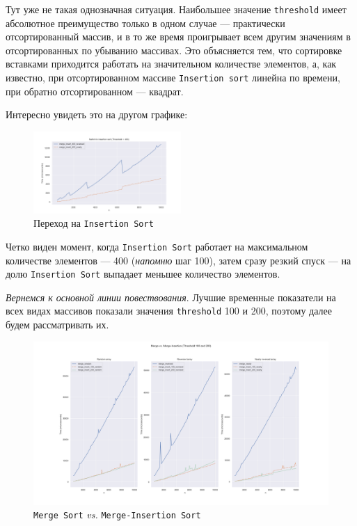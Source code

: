 \documentclass[11pt,a4paper]{scrarticle}
\theoremstyle{definition}
\begin{document}
Тут уже не такая однозначная ситуация. Наибольшее значение \texttt{threshold} имеет абсолютное преимущество только в одном случае --- практически отсортированный массив, и в то же время проигрывает всем другим значениям в отсортированных по убыванию массивах. Это объясняется тем, что сортировке вставками приходится работать на значительном количестве элементов, а, как известно, при отсортированном массиве \texttt{Insertion sort} линейна по времени, при обратно отсортированном --- квадрат.

Интересно увидеть это на другом графике:

\begin{figure}[htp]
	\centering
	\includegraphics[width=0.5\textwidth]{../static/switch_to_insertion_sort.png}
	\caption{Переход на \texttt{Insertion Sort}}
	\label{fig:switch-insertion}
\end{figure}
\FloatBarrier

Четко виден момент, когда \texttt{Insertion Sort} работает на максимальном количестве элементов --- 400 (\emph{напомню} шаг 100), затем сразу резкий спуск --- на долю \texttt{Insertion Sort} выпадает меньшее количество элементов.

\emph{Вернемся к основной линии повествования}. Лучшие временные показатели на всех видах массивов показали значения \texttt{threshold} 100 и 200, поэтому далее будем рассматривать их.

\begin{figure}[htp]
	\centering
	\includegraphics[width=\textwidth]{../static/merge_vs_merge_insertion.png}
	\caption{\texttt{Merge Sort} \emph{vs.} \texttt{Merge-Insertion Sort}}
	\label{fig:merge-vs-merge-ins}
\end{figure}
\FloatBarrier
\end{document}
